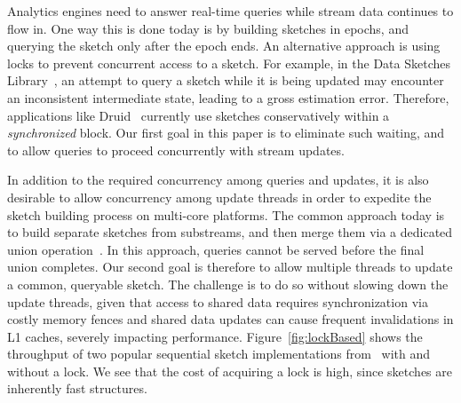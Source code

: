  Analytics engines need to answer real-time queries while  stream data continues to flow in.
 One way this is done 
today is by building sketches in epochs, and querying the sketch only after
 the epoch ends. An alternative approach is using locks to prevent concurrent access to a sketch.
 For example, in the Data Sketches Library~\cite{sketchesLibrary},  an 
attempt to query a sketch  while it is being updated  may encounter an inconsistent
intermediate state, leading to a gross estimation error. Therefore, applications like Druid~\cite{druid}
currently use sketches conservatively within a \emph{synchronized} block.
Our first goal in this paper is to eliminate such waiting, and to allow queries to proceed 
concurrently with stream updates. 

In addition to the required concurrency among queries and updates,
it is also desirable to allow
concurrency among update threads in order to expedite the sketch building process on multi-core platforms. 
The common approach today is to build separate sketches from substreams, 
and then merge them via a dedicated union operation~\cite{multi-KMV}. 
In this approach, queries cannot be served before the final union completes. 
Our second goal is therefore to allow multiple threads to update a common, 
queryable sketch. The challenge is to do so without slowing down the update threads,
given that access to shared data requires  synchronization via costly memory fences 
and shared data updates can cause frequent invalidations in L1 caches, severely impacting performance. 
Figure~\ref{fig:lockBased} shows the throughput of two  popular
sequential sketch implementations from~\cite{sketchesLibrary} with
and without a lock. We see that 
the cost of acquiring a lock  is  high, since  sketches are
inherently fast structures.

